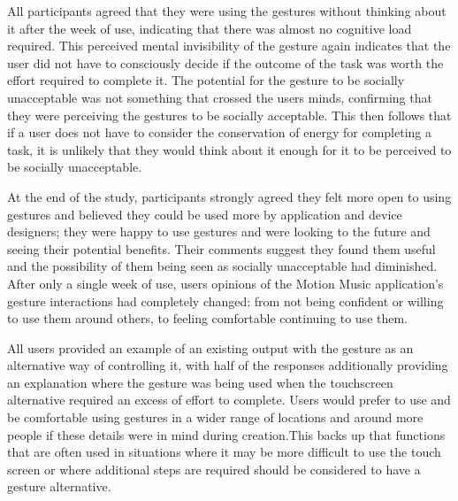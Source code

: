 \documentclass{l4proj}
\begin{document}
All participants agreed that they were using the gestures without thinking about it after the week of use, indicating that there was almost no cognitive load required. This perceived mental invisibility of the gesture again indicates that the user did not have to consciously decide if the outcome of the task was worth the effort required to complete it. The potential for the gesture to be socially unacceptable was not something that crossed the users minds, confirming that they were perceiving the gestures to be socially acceptable. This then follows that if a user does not have to consider the conservation of energy for completing a task, it is unlikely that they would think about it enough for it to be perceived to be socially unacceptable.

At the end of the study, participants strongly agreed they felt more open to using gestures and believed they could be used more by application and device designers; they were happy to use gestures and were looking to the future and seeing their potential benefits. Their comments suggest they found them useful and the possibility of them being seen as socially unacceptable had diminished. After only a single week of use, users opinions of the Motion Music application's gesture interactions had completely changed: from not being confident or willing to use them around others, to feeling comfortable continuing to use them.

All users provided an example of an existing output with the gesture as an alternative way of controlling it, with half of the responses additionally providing an explanation where the gesture was being used when the touchscreen alternative required an excess of effort to complete. Users would prefer to use and be comfortable using gestures in a wider range of locations and around more people if these details were in mind during creation.This backs up that functions that are often used in situations where it may be more difficult to use the touch screen or where additional steps are required should be considered to have a gesture alternative. 
\end{document}
